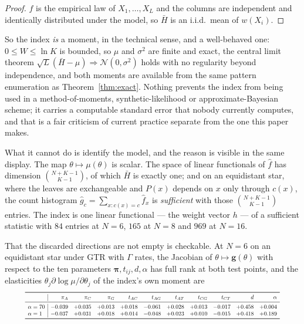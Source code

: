 \documentclass[preprint,12pt,authoryear]{elsarticle}
\newcommand{\Hbar}{\bar H}
\newcommand{\bpi}{\boldsymbol{\pi}}
\theoremstyle{definition}
\theoremstyle{remark}
\begin{document}
\begin{proof}
$\hat f$ is the empirical law of $X_1,\dots,X_L$ and the columns are
independent and identically distributed under the model, so $\Hbar$ is an
i.i.d.\ mean of $w(X_i)$.
\end{proof}

So the index \emph{is} a moment, in the technical sense, and a well-behaved
one: $0\le W\le\ln K$ is bounded, so $\mu$ and $\sigma^2$ are finite and
exact, the central limit theorem
$\sqrt L(\Hbar-\mu)\Rightarrow\mathcal N(0,\sigma^2)$ holds with no
regularity beyond independence, and both moments are available from the same
pattern enumeration as Theorem~\ref{thm:exact}. Nothing prevents the index
from being used in a method-of-moments, synthetic-likelihood or
approximate-Bayesian scheme; it carries a computable standard error that
nobody currently computes, and that is a fair criticism of current practice
separate from the one this paper makes.

What it cannot do is identify the model, and the reason is visible in the
same display. The map $\theta\mapsto\mu(\theta)$ is scalar. The space of
linear functionals of $\hat f$ has dimension $\binom{N+K-1}{K-1}$, of which
$\Hbar$ is exactly one; and on an equidistant star, where the leaves are
exchangeable and $P(x)$ depends on $x$ only through $c(x)$, the count
histogram $\hat g_c=\sum_{x:c(x)=c}\hat f_x$ is \emph{sufficient} with those
$\binom{N+K-1}{K-1}$ entries. The index is one linear functional --- the
weight vector $h$ --- of a sufficient statistic with $84$ entries at $N=6$,
$165$ at $N=8$ and $969$ at $N=16$.

That the discarded directions are not empty is checkable. At $N=6$ on an
equidistant star under GTR with $\Gamma$ rates, the Jacobian of
$\theta\mapsto\mathbf g(\theta)$ with respect to the ten parameters
$\bpi,t_{ij},d,\alpha$ has full rank at both test points, and the elasticities
$\theta_j\partial\log\mu/\partial\theta_j$ of the index's own moment are
\begin{equation}
\resizebox{0.9\textwidth}{!}{$
\begin{array}{l|rrrrrrrrrr}
\toprule
 & \pi_A & \pi_C & \pi_G & t_{AC} & t_{AG} & t_{AT} & t_{CG} & t_{CT} & d & \alpha \\
\midrule
\alpha=70 & -0.039 & +0.035 & +0.013 & +0.018 & -0.061 & +0.028 & +0.013 & -0.017 & +0.458 & +0.004 \\
\alpha=1  & -0.037 & +0.031 & +0.018 & +0.014 & -0.048 & +0.023 & +0.010 & -0.015 & +0.418 & +0.189 \\
\bottomrule
\end{array}$}
\end{equation}
\end{document}

